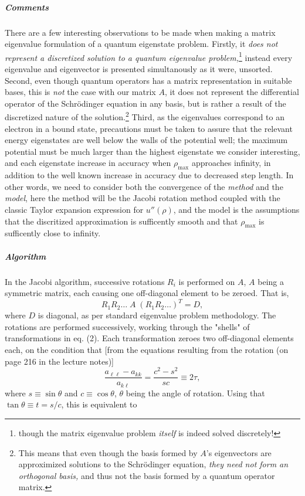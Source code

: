 \documentclass[a4paper,twocolumn,nofootinbib]{revtex4-1}
\begin{document}
\subparagraph{Comments}
There are a few interesting observations to be made when making a matrix eigenvalue formulation of a quantum eigenstate problem. Firstly, it \textit{does not represent a discretized solution to a quantum eigenvalue problem,}\footnote{though the matrix eigenvalue problem \textit{itself} is indeed solved discretely!} instead every eigenvalue and eigenvector is presented simultanously as it were, unsorted. Second, even though quantum operators has a matrix representation in suitable bases, this is \textit{not} the case with our matrix $A$, it does not represent the differential operator of the Schr\"odinger equation in any basis, but is rather a result of the discretized nature of the solution.\footnote{This means that even though the basis formed by $A$'s eigenvectors are approximized solutions to the Schr\"odinger equation, \textit{they need not form an orthogonal basis,} and thus not the basis formed by a quantum operator matrix.} Third, as the eigenvalues correspond to an electron in a bound state, precautions must be taken to assure that the relevant energy eigenstates are well below the walls of the potential well; the maximum potential must be much larger than the highest eigenstate we consider interesting, and each eigenstate increase in accuracy when $\rho_\text{max}$ approaches infinity, in addition to the well known increase in accuracy due to decreased step length. In other words, we need to consider both the convergence of the \textit{method} and the \textit{model}, here the method will be the Jacobi rotation method coupled with the classic Taylor expansion expression for $u''(\rho)$, and the model is the assumptions that the discritized approximation is sufficently smooth and that $\rho_\text{max}$ is sufficently close to infinity.
\subparagraph{Algorithm}
In the Jacobi algorithm, successive rotations $R_i$ is performed on $A$, $A$ being a symmetric matrix, each causing one off-diagonal element to be zeroed. That is,
\begin{equation} R_1R_2\dots \; A\;(R_1R_2\dots )^T = D, \end{equation}
where $D$ is diagonal, as per standard eigenvalue problem methodology. The rotations are performed successively, working through the "shells" of transformations in eq. (2). Each transformation zeroes two off-diagonal elements each, on the condition that
[from the equations resulting from the rotation (on page 216 in the lecture notes)]
\[ \frac{a_{\ell \ell}-a_{kk}}{a_{k\ell}}=\frac{c^2-s^2}{sc}\equiv 2\tau, \] where $s\equiv \sin \theta  $ and $c \equiv \cos \theta$, $\theta$ being the angle of rotation. Using that $\tan \theta \equiv t = s/c$, this is equivalent to
\end{document}

